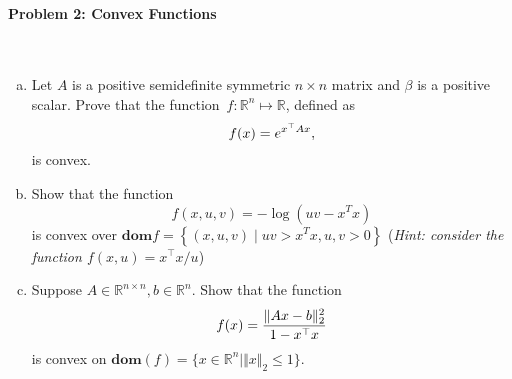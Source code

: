 \documentclass[a4paper]{article}
\begin{document}
\paragraph{Problem 2: Convex Functions}
~\\

\noindent
\begin{enumerate}[a)]

    \item Let $A$ is a positive semidefinite symmetric $n \times n$ matrix
          and $\beta$ is a positive scalar. Prove that the function~$f:\mathbb{R}^n \mapsto \mathbb{R}$, defined as
          \begin{equation}
              f(x) =  e^{x^\top A x}, \notag
          \end{equation}
          is convex.

    \item Show that the function
          \begin{equation*}
              f(x, u, v)=-\log \left(u v-x^{T} x\right)
          \end{equation*}
          is convex over $\textbf{dom} f=\left\{(x, u, v) \mid u v>x^{T} x, u, v>0\right\}$ (\textit{Hint: consider the function $f(x, u) = x^\top x / u$})

    \item
          Suppose $A\in\mathbb{R}^{n\times n}, b\in\mathbb{R}^{n}$. Show that the function
          \begin{equation}
              f(x)=\frac{\Vert Ax-b\Vert^2_2}{1-x^{\top}x} \notag
          \end{equation}
          is convex on $\textbf{dom}(f)=\{x\in\mathbb{R}^n|\Vert x\Vert_2\le 1\}$.

\end{enumerate}
\end{document}
